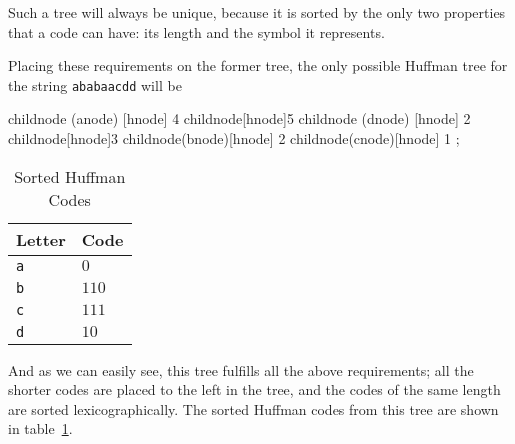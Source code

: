 Such a tree will always be unique, because it is sorted by the only
two properties that a code can have: its length and the symbol it
represents.

Placing these requirements on the former tree, the only possible
Huffman tree for the string \texttt{ababaacdd} will be

\begin{huffmanc}
  child{node (anode) [hnode] {4}}
  child{node[hnode]{5}
    child{node (dnode) [hnode] {2}}
    child{node[hnode]{3}
      child{node(bnode)[hnode] {2}}
      child{node(cnode)[hnode] {1}}
    }};

\end{huffmanc}

\begin{table}
  \centering
  \begin{tabular}{ll}
    \toprule
    Letter & Code \\
    \midrule
    \texttt{a} & $0$ \\
    \texttt{b} & $110$ \\
    \texttt{c} & $111$ \\
    \texttt{d} & $10$ \\
    \bottomrule
  \end{tabular}
  \caption{Sorted Huffman Codes}
  \label{tab:huffman-codes-sorted}
\end{table}

And as we can easily see, this tree fulfills all the above
requirements; all the shorter codes are placed to the left in the
tree, and the codes of the same length are sorted
lexicographically. The sorted Huffman codes from this tree are shown
in table~\ref{tab:huffman-codes-sorted}.





